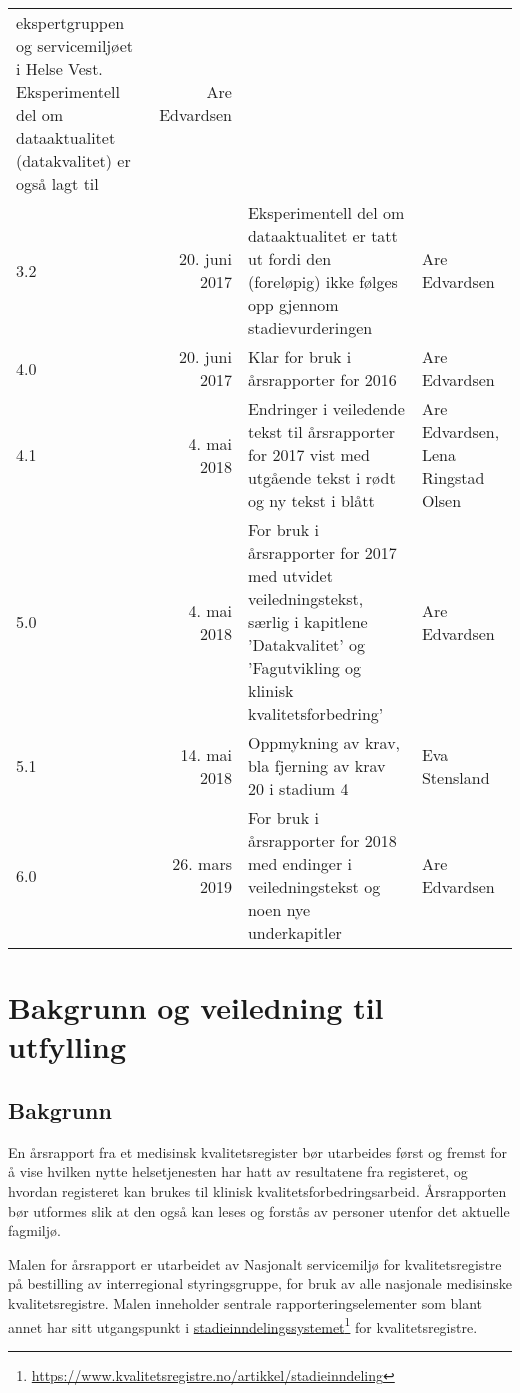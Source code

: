 \documentclass[norsk, a4paper, twocolumn]{report}
\begin{document}
\begin{longtable}{lrp{8cm}p{2.5cm}}
    ekspertgruppen og servicemiljøet i Helse Vest. Eksperimentell del om
    dataaktualitet (datakvalitet) er også lagt til & Are Edvardsen \\
    3.2 & 20. juni 2017 & Eksperimentell del om dataaktualitet er tatt ut fordi
    den (foreløpig) ikke følges opp gjennom stadievurderingen & Are Edvardsen \\
    4.0 & 20. juni 2017 & Klar for bruk i årsrapporter for 2016 & Are Edvardsen
    \\
    4.1 & 4. mai 2018 & Endringer i veiledende tekst til årsrapporter for 2017
    vist med utgående tekst i rødt og ny tekst i blått & Are Edvardsen, Lena
    Ringstad Olsen \\
    5.0 & 4. mai 2018 & For bruk i årsrapporter for 2017 med utvidet
    veiledningstekst, særlig i kapitlene 'Datakvalitet' og 'Fagutvikling og
    klinisk kvalitetsforbedring' & Are Edvardsen \\
    5.1 & 14. mai 2018 & Oppmykning av krav, bla fjerning av krav 20 i stadium
    4 & Eva Stensland \\
    6.0 & 26. mars 2019 & For bruk i årsrapporter for 2018 med endinger i
    veiledningstekst og noen nye underkapitler & Are Edvardsen
  \label{tab:log}
\end{longtable}
\fi




\chapter*{Bakgrunn og veiledning til utfylling}


\section*{Bakgrunn}
En årsrapport fra et medisinsk kvalitetsregister bør utarbeides først og
fremst for å vise hvilken nytte helsetjenesten har hatt av resultatene fra
registeret, og hvordan registeret kan brukes til klinisk
kvalitetsforbedringsarbeid. Årsrapporten bør utformes slik at den også kan leses
og forstås av personer utenfor det aktuelle fagmiljø.

Malen for årsrapport er utarbeidet av Nasjonalt servicemiljø for
kvalitetsregistre på bestilling av interregional styringsgruppe, for bruk av
alle nasjonale medisinske kvalitetsregistre. Malen inneholder sentrale
rapporteringselementer som blant annet har sitt utgangspunkt i
\href{https://www.kvalitetsregistre.no/artikkel/stadieinndeling}{stadieinndelingssystemet}\footnote{\url{https://www.kvalitetsregistre.no/artikkel/stadieinndeling}}
for kvalitetsregistre.
\end{document}

